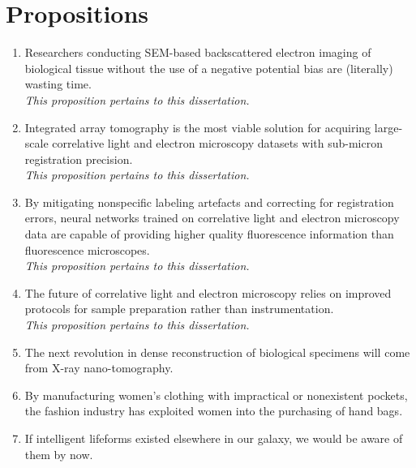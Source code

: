 \section*{\hfill Propositions \hfill}
\vspace{2em}


\begin{enumerate}
    \item Researchers conducting SEM-based backscattered electron imaging of biological tissue without the use of a negative potential bias are (literally) wasting time. \\
    \textit{This proposition pertains to this dissertation.}
    \item Integrated array tomography is the most viable solution for acquiring large-scale correlative light and electron microscopy datasets with sub-micron registration precision. \\
    \textit{This proposition pertains to this dissertation.}
    \item By mitigating nonspecific labeling artefacts and correcting for registration errors, neural networks trained on correlative light and electron microscopy data are capable of providing higher quality fluorescence information than fluorescence microscopes. \\
    \textit{This proposition pertains to this dissertation.}
    \item The future of correlative light and electron microscopy relies on improved protocols for sample preparation rather than instrumentation. \\
    \textit{This proposition pertains to this dissertation.}
    \item The next revolution in dense reconstruction of biological specimens will come from X-ray nano-tomography.
    \item By manufacturing women's clothing with impractical or nonexistent pockets, the fashion industry has exploited women into the purchasing of hand bags.
    \item If intelligent lifeforms existed elsewhere in our galaxy, we would be aware of them by now.

\end{enumerate}
